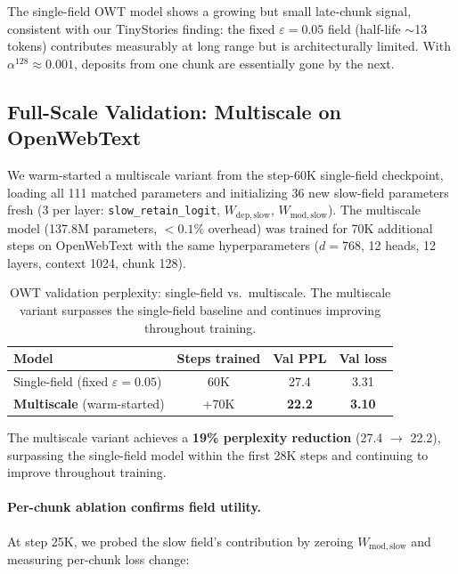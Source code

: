 \documentclass[11pt,a4paper]{article}
\newcommand{\evap}{\varepsilon}
\newcommand{\retain}{\alpha}
\begin{document}
The single-field OWT model shows a growing but small late-chunk
signal, consistent with our TinyStories finding: the fixed
$\evap = 0.05$ field (half-life $\sim$13 tokens) contributes
measurably at long range but is architecturally limited.  With
$\retain^{128} \approx 0.001$, deposits from one chunk are
essentially gone by the next.

\subsection{Full-Scale Validation: Multiscale on OpenWebText}
\label{sec:owt-multiscale}

We warm-started a multiscale variant from the step-60K single-field
checkpoint, loading all 111 matched parameters and initializing 36
new slow-field parameters fresh (3 per layer: \texttt{slow\_retain\_logit},
$W_{\mathrm{dep,slow}}$, $W_{\mathrm{mod,slow}}$).  The multiscale
model (137.8M parameters, $<0.1\%$ overhead) was trained for 70K
additional steps on OpenWebText with the same hyperparameters
($d = 768$, 12 heads, 12 layers, context 1024, chunk 128).

\begin{table}[h]
\centering
\caption{OWT validation perplexity: single-field vs.\ multiscale.
  The multiscale variant surpasses the single-field baseline and
  continues improving throughout training.}
\label{tab:owt-multiscale-ppl}
\begin{tabular}{@{}lccc@{}}
\toprule
Model & Steps trained & Val PPL & Val loss \\
\midrule
Single-field (fixed $\evap = 0.05$) & 60K & 27.4 & 3.31 \\
\textbf{Multiscale} (warm-started) & +70K & \textbf{22.2} & \textbf{3.10} \\
\bottomrule
\end{tabular}
\end{table}

The multiscale variant achieves a \textbf{19\% perplexity reduction}
(27.4 $\to$ 22.2), surpassing the single-field model within the first
28K steps and continuing to improve throughout training.

\paragraph{Per-chunk ablation confirms field utility.}
At step 25K, we probed the slow field's contribution by zeroing
$W_{\mathrm{mod,slow}}$ and measuring per-chunk loss change:
\end{document}
